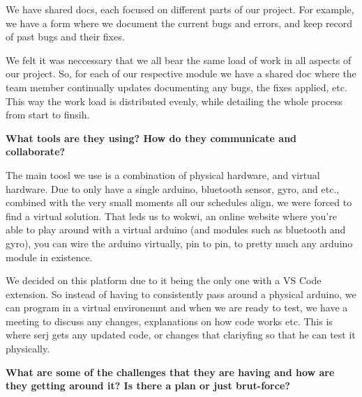 \documentclass[12pt]{article}
\begin{document}
We have shared docs, each focused on different parts of our project. For example, we have a form where we document the current bugs and errors, and keep record of past bugs and their fixes.

We felt it was neccessary that we all bear the same load of work in all aspects of our project. So, for each of our respective module we have a shared doc where the team member continually updates documenting any bugs, the fixes applied, etc. This way the work load is distributed evenly, while detailing the whole process from start to finsih.

\textbf{What tools are they using? How do they communicate and collaborate?}

The main toosl we use is a combination of physical hardware, and virtual hardware. Due to only have a single arduino, bluetooth sensor, gyro, and etc., combined with the very small moments all our schedules align, we were forced to find a virtual solution. That leds us to wokwi, an online website where you're able to play around with a virtual arduino (and modules such as bluetooth and gyro), you can wire the arduino virtually, pin to pin, to pretty much any arduino module in existence. 

We decided on this platform due to it being the only one with a VS Code extension. So instead of having to consistently pass around a physical arduino, we can program in a virtual environemnt and when we are ready to test, we have a meeting to discuss any changes, explanations on how code works etc. This is where serj gets any updated code, or changes that clariyfing so that he can test it physically. 

\textbf{What are some of the challenges that they are having and how are they getting around it? Is there a plan or just brut-force?}
\end{document}
